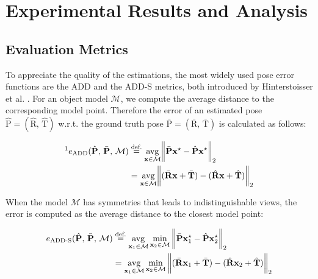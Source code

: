 
\chapter{Experimental Results and Analysis}\label{chapter:presentation_of_the_results}

\section{Evaluation Metrics}

To appreciate the quality of the estimations, the most widely used pose error functions are the \ac{ADD} and the \ac{ADD-S} metrics, both introduced by Hinterstoisser et al. \cite{10.1007/978-3-642-37331-2_42}. For an object model $\mathcal{M}$, we compute the average distance to the corresponding model point. Therefore the error of an estimated pose $\hat{\bm{\mathrm{P}}}=(\hat{\bm{\mathrm{R}}},\,\hat{\bm{\mathrm{T}}})$ w.r.t. the ground truth pose $\bar{\bm{\mathrm{P}}}=(\bar{\bm{\mathrm{R}}},\,\bar{\bm{\mathrm{T}}})$ is calculated as follows:

\begin{align}
	\textit{\footnotemark}e_\mathrm{ADD}(\hat{\bm{\mathrm{P}}},\,\bar{\bm{\mathrm{P}}},\,\mathcal{M})&\stackrel{\text{def.}}{=}\underset{\bm{\mathrm{x}}\in\mathcal{M}}{\mathrm{avg}}\norm\bigg{\bar{\bm{\mathrm{P}}}\bm{\mathrm{x}}^\star-\hat{\bm{\mathrm{P}}}\bm{\mathrm{x}}^\star}_2 \\
	&=\underset{\bm{\mathrm{x}}\in\mathcal{M}}{\mathrm{avg}}\norm\bigg{(\bar{\bm{\mathrm{R}}}\bm{\mathrm{x}}+\bar{\bm{\mathrm{T}}})-(\hat{\bm{\mathrm{R}}}\bm{\mathrm{x}}+\hat{\bm{\mathrm{T}}})}_2
\end{align}

When the model $\mathcal{M}$ has symmetries that leads to indistinguishable views, the error is computed as the average distance to the closest model point:
 
\begin{align}
	e_{\mathrm{ADD}\text{-}\mathrm{S}}(\hat{\bm{\mathrm{P}}},\,\bar{\bm{\mathrm{P}}},\,\mathcal{M})&\stackrel{\text{def.}}{=} \underset{\bm{\mathrm{x}}_1\in\mathcal{M}}{\mathrm{avg}}\min\limits_{\bm{\mathrm{x}}_2\in\mathcal{M}}\norm\bigg{\bar{\bm{\mathrm{P}}}\bm{\mathrm{x}}_1^\star-\hat{\bm{\mathrm{P}}}\bm{\mathrm{x}}_2^\star}_2 \\
	&=\underset{\bm{\mathrm{x}}_1\in\mathcal{M}}{\mathrm{avg}}\min\limits_{\bm{\mathrm{x}}_2\in\mathcal{M}}\norm\bigg{(\bar{\bm{\mathrm{R}}}\bm{\mathrm{x}}_1+\bar{\bm{\mathrm{T}}})-(\hat{\bm{\mathrm{R}}}\bm{\mathrm{x}}_2+\hat{\bm{\mathrm{T}}})}_2
\end{align}

